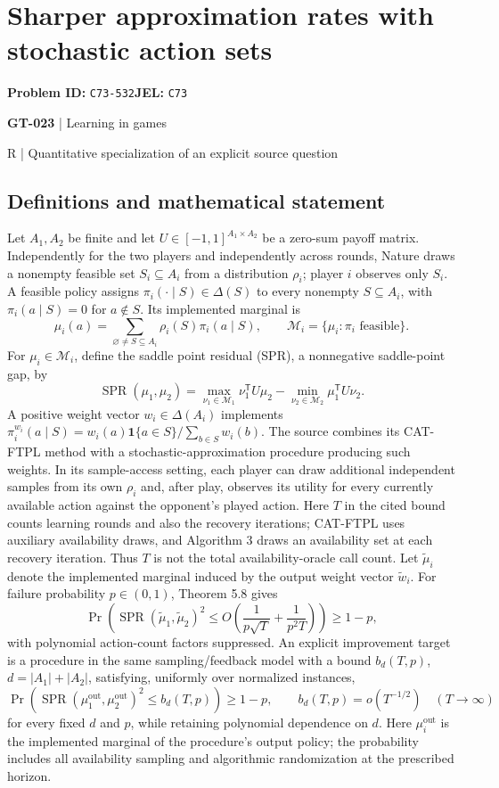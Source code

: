 \documentclass[11pt,a4paper]{article}
\begin{document}
\section*{Sharper approximation rates with stochastic action sets}
\textbf{Problem ID:} \texttt{C73-532}\quad \textbf{JEL:} \texttt{C73}\par
\label{problem:OP-0153}
\label{game:GT-023}
{\sffamily\small\color{muted}
{\sffamily\small\color{muted}\textbf{GT-023} | Learning in games\par R | Quantitative specialization of an explicit source question\par}
\par}
\subsection*{Definitions and mathematical statement}
Let $A_1,A_2$ be finite and let $U\in[-1,1]^{A_1\times A_2}$ be a zero-sum payoff matrix. Independently for the two players and independently across rounds, Nature draws a nonempty feasible set $S_i\subseteq A_i$ from a distribution $\rho_i$; player $i$ observes only $S_i$. A feasible policy assigns $\pi_i(\cdot\mid S)\in\Delta(S)$ to every nonempty $S\subseteq A_i$, with $\pi_i(a\mid S)=0$ for $a\notin S$. Its implemented marginal is
\[
 \mu_i(a)=\sum_{\varnothing\ne S\subseteq A_i}\rho_i(S)\pi_i(a\mid S),
 \qquad \mathcal M_i=\{\mu_i:\pi_i\text{ feasible}\}.
\]
For $\mu_i\in\mathcal M_i$, define the saddle point residual (SPR), a nonnegative saddle-point gap, by
\[
 \operatorname{SPR}(\mu_1,\mu_2)=
 \max_{\nu_1\in\mathcal M_1}\nu_1^{\mathsf T}U\mu_2
 -\min_{\nu_2\in\mathcal M_2}\mu_1^{\mathsf T}U\nu_2.
\]
A positive weight vector $w_i\in\Delta(A_i)$ implements
$\pi_i^{w_i}(a\mid S)=w_i(a)\mathbf1\{a\in S\}/\sum_{b\in S}w_i(b)$.
The source combines its CAT-FTPL method with a stochastic-approximation procedure producing such weights. In its sample-access setting, each player can draw additional independent samples from its own $\rho_i$ and, after play, observes its utility for every currently available action against the opponent's played action. Here $T$ in the cited bound counts learning rounds and also the recovery iterations; CAT-FTPL uses auxiliary availability draws, and Algorithm 3 draws an availability set at each recovery iteration. Thus $T$ is not the total availability-oracle call count. Let $\widetilde\mu_i$ denote the implemented marginal induced by the output weight vector $\widetilde w_i$. For failure probability $p\in(0,1)$, Theorem 5.8 gives
\[
 \Pr\!\left(\operatorname{SPR}(\widetilde\mu_1,\widetilde\mu_2)^2
 \leq O\!\left(\frac1{p\sqrt T}+\frac1{p^2T}\right)\right)\geq1-p,
\]
with polynomial action-count factors suppressed. An explicit improvement target is a procedure in the same sampling/feedback model with a bound $b_{d}(T,p)$, $d=|A_1|+|A_2|$, satisfying, uniformly over normalized instances,
\[
 \Pr(\operatorname{SPR}(\mu_1^{\mathrm{out}},\mu_2^{\mathrm{out}})^2\leq b_d(T,p))\geq1-p,
 \qquad b_d(T,p)=o(T^{-1/2})\quad(T\to\infty)
\]
for every fixed $d$ and $p$, while retaining polynomial dependence on $d$. Here $\mu_i^{\mathrm{out}}$ is the implemented marginal of the procedure's output policy; the probability includes all availability sampling and algorithmic randomization at the prescribed horizon.
\end{document}
